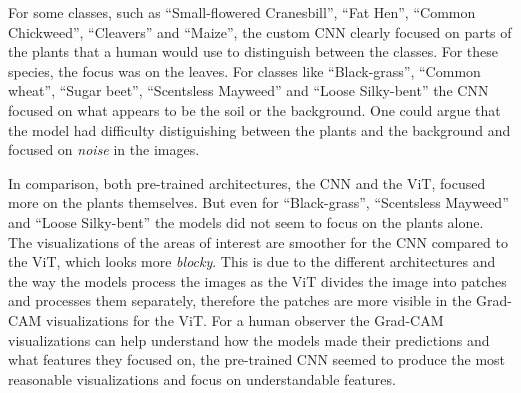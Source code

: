 For some classes, such as ``Small-flowered Cranesbill'', ``Fat Hen'', ``Common Chickweed'', ``Cleavers'' and ``Maize'', the custom CNN clearly focused on parts of the plants that a human would use to distinguish between the classes. For these species, the focus was on the leaves. For classes like ``Black-grass'', ``Common wheat'', ``Sugar beet'', ``Scentsless Mayweed'' and ``Loose Silky-bent'' the CNN focused on what appears to be the soil or the background. One could argue that the model had difficulty distiguishing between the plants and the background and focused on \textit{noise} in the images.

In comparison, both pre-trained architectures, the CNN and the ViT, focused more on the plants themselves. But even for ``Black-grass'', ``Scentsless Mayweed'' and ``Loose Silky-bent'' the models did not seem to focus on the plants alone. The visualizations of the areas of interest are smoother for the CNN compared to the ViT, which looks more \textit{blocky}. This is due to the different architectures and the way the models process the images as the ViT divides the image into patches and processes them separately, therefore the patches are more visible in the Grad-CAM visualizations for the ViT. For a human observer the Grad-CAM visualizations can help understand how the models made their predictions and what features they focused on, the pre-trained CNN seemed to produce the most reasonable visualizations and focus on understandable features.